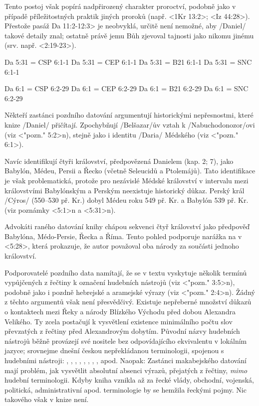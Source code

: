 Tento postoj však popírá nadpřirozený charakter proroctví, podobně jako v případě příležitostných praktik jiných proroků (např. <1Kr 13:2>; <Iz 44:28>). Přestože pasáž  \<Da 11:2-12:3> je neobvyklá, určitě není nemožné, aby \x/Daniel/ takové detaily znal; ostatně právě jemu Bůh zjevoval tajnosti jako nikomu jinému (srv. např. <2:19-23>).  




\renum Da 5:31 = CSP 6:1-1
\renum Da 5:31 = CEP 6:1-1
\renum Da 5:31 = B21 6:1-1
\renum Da 5:31 = SNC 6:1-1 

\renum Da 6:1 = CSP 6:2-29
\renum Da 6:1 = CEP 6:2-29
\renum Da 6:1 = B21 6:2-29
\renum Da 6:1 = SNC 6:2-29


Někteří zastánci pozdního datování argumentují historickými nepřesnostmi, které knize \x/Daniel/ přičítají.
Zpochybňují \x/Belšazar/ův vztah k \x/Nabuchodonozor/ovi (viz <"pozn." 5:2>n), stejně jako i identitu  \x/Daria/ Médského (viz <"pozn." 6:1>). 

Navíc identifikují čtyři království, předpovězená Danielem (kap. 2; 7), jako Babylón, Médeu, Persii a Řecko (včetně Seleucidů a Ptolemájů). Tato identifikace je však problematická, protože pro nezávislé Médské království v intervalu mezi královstvími Babylónským a Perským neexistuje historický důkaz.
Perský král \x/Cýros/ (550--530 př. Kr.) dobyl Médeu roku 549 př. Kr. a Babylón 539 př. Kr. (viz poznámky <5:1>n a <5:31>n).

Advokáti raného datování knihy chápou sekvenci čtyř království jako předpověď Babylóna, Médo-Persie, Řecka a Říma. 
Tento pohled podporuje narážka na  v <5:28>, která prokazuje, že autor považoval oba národy za součásti jednoho království.

Podporovatelé pozdního data namítají, že se v textu vyskytuje několik termínů vypůjčených z řečtiny k označení hudebních nástrojů (viz <"pozn." 3:5>n), podobně jako i  pozdně hebrejské a aramejské výrazy (viz <"pozn." 2:4>n).
Žádný z těchto argumentů však není přesvědčivý.
Existuje nepřeberné množství důkazů o kontaktech mezi Řeky a národy Blízkého Východu před dobou Alexandra Velikého. Ty zcela postačují k vysvětlení existence minimálního počtu slov převzatých z řečtiny před Alexandrovým dobytím. 
Původní názvy hudebních nástrojů běžně provázejí své nositele bez odpovídajícího ekvivalentu v lokálním jazyce; srovnejme dnešní českou nepřekládanou terminologii, spojenou s hudebními nástroji:  , , , , , , , ,  apod.
Naopak: Zastánci makabejského datování mají problém, jak vysvětlit absolutní absenci výrazů, přejatých z řečtiny, {\it mimo\/} hudební terminologii. Kdyby kniha vznikla až za řecké vlády, obchodní, vojenská, politická, administrativní apod. terminologie  by se hemžila řeckými pojmy. Nic takového však v knize není.

